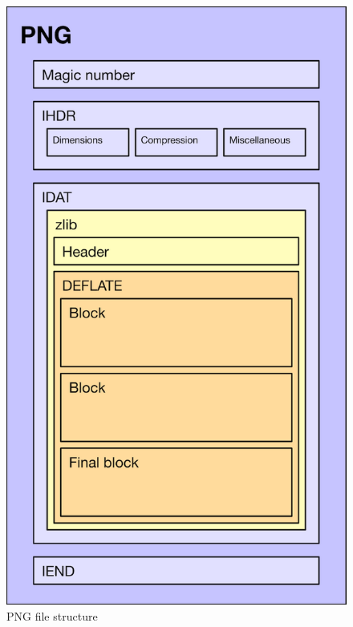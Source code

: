 \documentclass{article}
\begin{document}
\begin{figure}[htb]
    \centering
    \hfill
    \begin{minipage}[b]{0.3\textwidth}
        \includegraphics[width=\textwidth]{png-file-format.png}
        \caption{PNG file structure}
    \label{fig:png-structure}
    \end{minipage}
    \hfill
    \begin{minipage}[b]{0.36\textwidth}

\end{minipage}
\end{figure}
\end{document}
